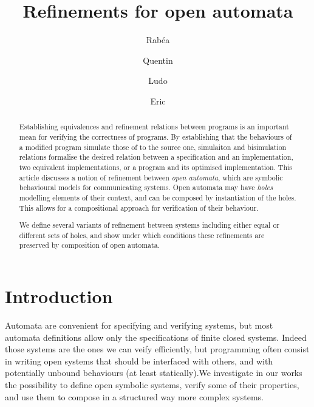\documentclass[runningheads]{llncs}
\begin{document}
%
\title{Refinements for open automata}
%
%
\author{
Rabéa \and
Quentin \and
Ludo \and
Eric}
%
%
%
\maketitle              %
%
\begin{abstract}

Establishing equivalences and refinement relations between programs is an important mean for 
verifying the correctness of programs. By establishing that the
behaviours of a modified program simulate those of to the source one, simulaiton and bisimulation relations  formalise the desired  relation between a specification and an implementation, 
 two equivalent implementations, or a program and its optimised implementation.
This article discusses a notion of refinement between \emph{open automata}, which are symbolic
behavioural models for communicating systems. 
Open automata may have \emph{holes} modelling elements of their
context, and can be composed by instantiation of the holes. This allows for a compositional approach for
verification of their behaviour.

We define several variants of refinement between systems including either equal or different sets of holes, and 
show under which conditions these refinements are preserved by composition of open automata. 


\end{abstract}
%
%
%
\section{Introduction}

Automata are convenient for specifying and verifying systems, but most automata definitions allow only the specifications of finite closed systems. Indeed those systems are the ones we can veify efficiently, but programming often consist in writing open systems that should be interfaced with others, and with potentially unbound behaviours (at least statically).We investigate in our works the possibility to define open symbolic systems, verify some of their properties, and use them to compose in a structured way more complex systems.
\end{document}
